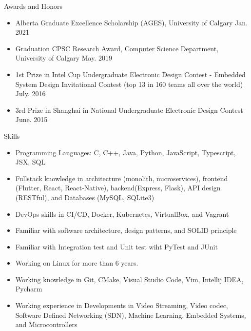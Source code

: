 \documentclass[10pt,oneside]{article}
\newenvironment{ressection}[1]{
	\vspace{4pt}
	{\fontfamily{phv}\selectfont\Large#1}
	\begin{itemize}
	\vspace{3pt}
}{
	\end{itemize}
}
\newcommand{\resitem}[1]{
	\vspace{-4pt}
	\item \begin{flushleft} #1 \end{flushleft}
}
\begin{document}
\begin{ressection}{Awards and Honors}
	\resitem{Alberta Graduate Excellence Scholarship (AGES), University of Calgary \hfill Jan. 2021}
	\resitem{Graduation CPSC Research Award, Computer Science Department,
		University of Calgary \hfill May. 2019}
	\resitem{1st Prize in Intel Cup Undergraduate Electronic Design Contest - Embedded System Design Invitational Contest (top 13 in 160 teams all over the world) \hfill July. 2016}
	\resitem{3rd Prize in Shanghai in National Undergraduate Electronic Design Contest \hfill {June. 2015}}
\end{ressection}

\begin{ressection}{Skills}
	\resitem{Programming Languages: C, C++, Java, Python, JavaScript, Typescript, JSX, SQL}
	\resitem{Fullstack knowledge in architecture (monolith, microservices), frontend (Flutter, React, React-Native), backend(Express, Flask), API design (RESTful), and Databases (MySQL, SQLite3)}
	\resitem{DevOps skills in CI/CD, Docker, Kubernetes, VirtualBox, and Vagrant}
	\resitem{Familiar with software architecture, design patterns, and SOLID principle}
	\resitem{Familiar with Integration test and Unit test wiht PyTest and JUnit}
	\resitem{Working on Linux for more than 6 years.}
	\resitem{Working knowledge in Git, CMake, Visual Studio Code, Vim, Intellij IDEA, Pycharm}
	\resitem{Working experience in Developments in Video Streaming, Video codec, Software
		Defined Networking (SDN), Machine Learning, Embedded Systems, and Microcontrollers}
\end{ressection}
\end{document}
